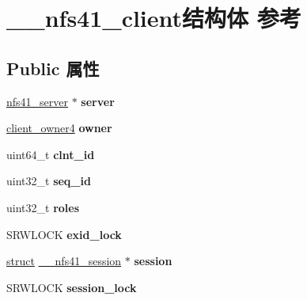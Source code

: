 \hypertarget{struct____nfs41__client}{}\section{\+\_\+\+\_\+nfs41\+\_\+client结构体 参考}
\label{struct____nfs41__client}
\subsection*{Public 属性}
\begin{DoxyCompactItemize}
\item 
\mbox{\label{struct____nfs41__client_a9588c14b88065c5c478793303853fbfc}} 
\hyperlink{struct____nfs41__server}{nfs41\+\_\+server} $\ast$ {\bfseries server}
\item 
\mbox{\label{struct____nfs41__client_a818e6475aa8b6a073d43dbfca8511c99}} 
\hyperlink{struct____client__owner4}{client\+\_\+owner4} {\bfseries owner}
\item 
\mbox{\label{struct____nfs41__client_a733618361c65a2387460fb573f49c723}} 
uint64\+\_\+t {\bfseries clnt\+\_\+id}
\item 
\mbox{\label{struct____nfs41__client_ae4fbbb7af2d9a91e10717f10dd8845dd}} 
uint32\+\_\+t {\bfseries seq\+\_\+id}
\item 
\mbox{\label{struct____nfs41__client_a4072f4c2ba63fdd1d3f92144d3ec9855}} 
uint32\+\_\+t {\bfseries roles}
\item 
\mbox{\label{struct____nfs41__client_aadd893c19e4745c0be7ae5589a31e20c}} 
S\+R\+W\+L\+O\+CK {\bfseries exid\+\_\+lock}
\item 
\mbox{\label{struct____nfs41__client_a9aa8477b8fb1e3daaa7157f8d41ddfb2}} 
\hyperlink{interfacestruct}{struct} \hyperlink{struct____nfs41__session}{\+\_\+\+\_\+nfs41\+\_\+session} $\ast$ {\bfseries session}
\item 
\mbox{\label{struct____nfs41__client_ae8bce275429b989fae1e206644829312}} 
S\+R\+W\+L\+O\+CK {\bfseries session\+\_\+lock}

\end{DoxyCompactItemize}

